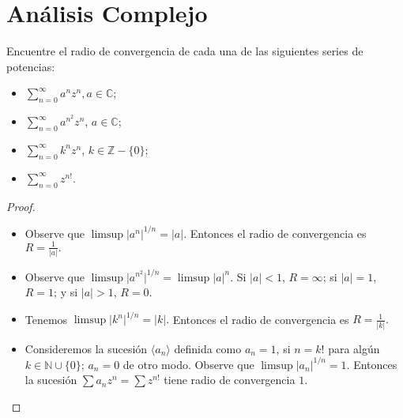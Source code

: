 \documentclass[12pt]{article}
\newcommand{\N}{\mathbb{N}}
\newcommand{\Z}{\mathbb{Z}}
\newcommand{\C}{\mathbb{C}}
\newenvironment{problem}[2][Problema]{\begin{trivlist}
\item[\hskip \labelsep {\bfseries #1}\hskip \labelsep {\bfseries #2.}]}{\end{trivlist}}
\begin{document}
\section*{Análisis Complejo}
\text{ }

\begin{problem}{6 pp. 33} Encuentre el radio de convergencia de cada una de las siguientes series de potencias:
\begin{itemize}
    \item[a)] $\sum_{n=0}^\infty a^n z^n, a \in \C$;
    \item[b)] $\sum_{n=0}^\infty a^{n^2} z^n$, $a \in \C$;
    \item[c)] $\sum_{n=0}^\infty k^{n} z^n$, $k \in \Z - \{0\}$;
    \item[d)] $\sum_{n=0}^\infty  z^{n!}$.
\end{itemize}
\end{problem}
\begin{proof} \text{ }
\begin{itemize}
    \item[a)] Observe que $\limsup \lvert a^n \rvert^{1/n} = \lvert a \rvert.$ Entonces el radio de convergencia es $R = \frac{1}{\lvert a \rvert}.$
    \item[b)] Observe que $\limsup \lvert a^{n^2} \rvert^{1/n} = \limsup \lvert a \lvert^n$. Si $\lvert a \rvert < 1$, $R = \infty$; si $\lvert a \rvert  = 1$, $R = 1$; y si $\lvert a \lvert > 1$, $R = 0.$
    \item[c)] Tenemos $\limsup \lvert k^n \rvert^{1/n} = \lvert k \lvert.$ Entonces el radio de convergencia es $R = \frac{1}{\lvert k \rvert}.$
    \item[d)] Consideremos la sucesión $\langle a_n \rangle$ definida como $a_n = 1$, si $n = k!$ para algún $k \in \N \cup \{0\}$; $a_n = 0$ de otro modo. Observe que $\limsup \lvert a_n \rvert^{1/n} = 1$. Entonces la sucesión $\sum a_n z^n = \sum z^{n!}$ tiene radio de convergencia $1$. 
\end{itemize}
\end{proof}
\end{document}
